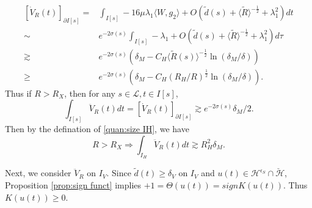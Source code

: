 \documentclass[reqno, 11pt]{amsart}
\numberwithin{equation}{section}
\theoremstyle{plain}
\theoremstyle{definition}
\numberwithin{equation}{section}
\numberwithin{theorem}{section}
\numberwithin{equation}{section}
\numberwithin{equation}{section}
\numberwithin{theorem}{section}
\begin{document}
	\begin{equation*}
	\begin{aligned}
	[\dot{V}_R(t)]_{\partial I[s]}=&\int_{I[s]} -16\mu\lambda_{1} \langle W,g_2\rangle+O\left( \widetilde{d}(s)+\langle \widetilde{R} \rangle^{-\frac{1}{2}}+\lambda_{1}^2 \right)dt\\\sim&e^{-2\sigma(s)}\int_{I[s]} -\lambda_{1}+O\left( \widetilde{d}(s)+\langle \widetilde{R} \rangle^{-\frac{1}{2}}+\lambda_{1}^2 \right)d\tau\\\gtrsim& e^{-2\sigma(s)}\left( \delta_{M}-C_{H}\langle \widetilde{R}(s) \rangle^{-\frac{1}{2}}\ln \left(\delta_{M}/\delta \right) \right)\\\geq& e^{-2\sigma(s)}\left( \delta_{M}-C_{H}\left(R_H/R\right)^{\frac{1}{2}}\ln \left( \delta_{M}/\delta\right) \right).
	\end{aligned}
	\end{equation*}
	Thus if $R>R_X$, then for any $s\in \mathscr{L}, t\in I[s]$,
	\begin{equation*}
	\int_{I[s]} \ddot{V}_R(t)dt=[ \dot{V}_R(t)]_{\partial I[s]}\gtrsim e^{-2\sigma(s)}\delta_{M}/2.
	\end{equation*}
	Then by the defination of \eqref{quan:size IH}, we have 
	\begin{equation}\label{est:IH int scat}
	R>R_X  \Longrightarrow \int_{I_H} \ddot{V}_R(t) dt \gtrsim R_H^2 \delta_{M}.
	\end{equation}
	
	
	Next, we consider $\ddot{V}_R$ on $I_V$. Since $\widetilde{d}(t)\geq\delta_{V}$ on $I_V$ and $u
	(t)\in\mathcal{H}^{\epsilon_S}\cap \check{\mathcal{H}}$, Proposition \ref{prop:sign funct} implies $+1=\Theta(u(t))=signK(u(t))$. Thus $K(u(t))\geq0$.
	
\end{document}
